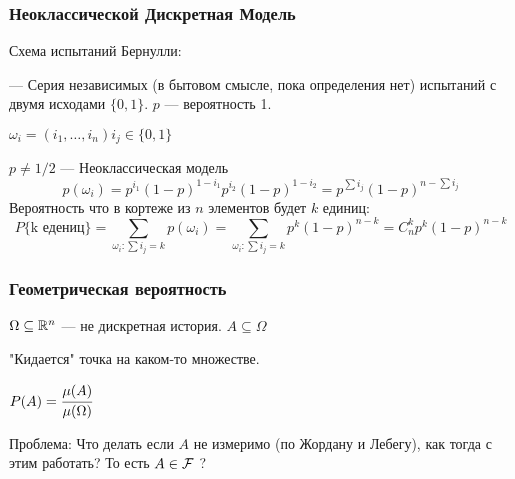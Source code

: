 \subsubsection{Неоклассической Дискретная Модель}  
Схема испытаний Бернулли:

--- Серия независимых (в бытовом смысле, пока определения нет) испытаний с двумя исходами $\{0,1\}$. $p$ --- вероятность 1.

$\omega_i = (i_1, \ldots, i_n) i_j \in \{0, 1\}$

$p \neq 1/2$ --- Неоклассическая модель  
$$
p(\omega_i) = p^{i_1}(1-p)^{1-i_1}p^{i_2}(1 - p)^{1-i_2} = p^{\sum i_j} (1-p)^{n - \sum i_j}
$$
Вероятность что в кортеже из $n$ элементов будет $k$ единиц:
$$
P\{\text{k едениц}\} = \sum_{\omega_i: \sum i_j = k} p(\omega_i) = \sum_{\omega_i: \sum i_j = k} p^k (1 - p)^{n-k} = C_n^kp^k(1-p)^{n-k}
$$

\subsubsection{Геометрическая вероятность}  
$\Omega \subseteq \mathbb{R}^n$ --- не дискретная история. $A \subseteq \Omega$

"Кидается" точка на каком-то множестве. 

$P(A) = \cfrac{\mu(A)}{\mu(\Omega)}$  

Проблема: Что делать если $A$ не измеримо (по Жордану и Лебегу), как тогда с этим работать? То есть $A \in \mathcal{F} $ ?
